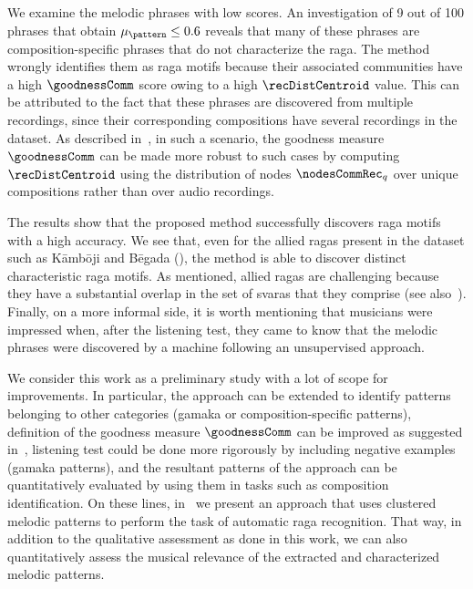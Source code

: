 {We examine the melodic phrases with low scores. An investigation of 9 out of 100 phrases that obtain $\mu_\pattern\leq0.6$ reveals that many of these phrases are composition-specific phrases that do not characterize the \gls{raga}. The method wrongly identifies them as \gls{raga} motifs because their associated communities have a high $\goodnessComm$ score owing to a high $\recDistCentroid$ value. This can be attributed to the fact that these phrases are discovered from multiple recordings, since their corresponding compositions have several recordings in the dataset. As described in~, in such a scenario, the goodness measure $\goodnessComm$ can be made more robust to such cases by computing $\recDistCentroid$ using the distribution of nodes ${{\nodesCommRec}_q}$ over unique compositions rather than over audio recordings.

The results show that the proposed method successfully discovers \gls{raga} motifs with a high accuracy. We see that, even for the allied \glspl{raga} present in the dataset such as K\={a}mb\={o}ji and B\={e}gada (), the method is able to discover distinct characteristic \gls{raga} motifs. As mentioned, allied \glspl{raga} are challenging because they have a substantial overlap in the set of \glspl{svara} that they comprise (see also~). Finally, on a more informal side, it is worth mentioning that musicians were impressed when, after the listening test, they came to know that the melodic phrases were discovered by a machine following an unsupervised approach. 





We consider this work as a preliminary study with a lot of scope for improvements. In particular, the approach can be extended to identify patterns belonging to other categories (\gls{gamaka} or composition-specific patterns), definition of the goodness measure $\goodnessComm$ can be improved as suggested in~, listening test could be done more rigorously by including negative examples (\gls{gamaka} patterns), and the resultant patterns of the approach can be quantitatively evaluated by using them in tasks such as composition identification. On these lines, in~ we present an approach that uses clustered melodic patterns to perform the task of automatic \gls{raga} recognition. That way, in addition to the qualitative assessment as done in this work, we can also quantitatively assess the musical relevance of the extracted and characterized melodic patterns.



}
